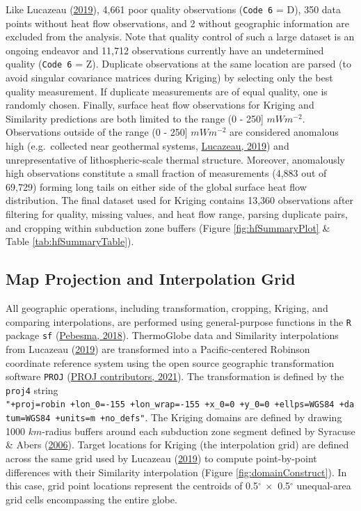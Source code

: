 Like Lucazeau (\protect\hyperlink{ref-lucazeau2019}{2019}), 4,661 poor quality observations (\texttt{Code\ 6} = D), 350 data points without heat flow observations, and 2 without geographic information are excluded from the analysis. Note that quality control of such a large dataset is an ongoing endeavor and 11,712 observations currently have an undetermined quality (\texttt{Code\ 6} = Z). Duplicate observations at the same location are parsed (to avoid singular covariance matrices during Kriging) by selecting only the best quality measurement. If duplicate measurements are of equal quality, one is randomly chosen. Finally, surface heat flow observations for Kriging and Similarity predictions are both limited to the range (0 - 250{]} \(mWm^{-2}\). Observations outside of the range (0 - 250{]} \(mWm^{-2}\) are considered anomalous high (e.g.~collected near geothermal systems, \protect\hyperlink{ref-lucazeau2019}{Lucazeau, 2019}) and unrepresentative of lithospheric-scale thermal structure. Moreover, anomalously high observations constitute a small fraction of measurements (4,883 out of 69,729) forming long tails on either side of the global surface heat flow distribution. The final dataset used for Kriging contains 13,360 observations after filtering for quality, missing values, and heat flow range, parsing duplicate pairs, and cropping within subduction zone buffers (Figure \ref{fig:hfSummaryPlot} \& Table \ref{tab:hfSummaryTable}).

\hypertarget{map-projection-and-interpolation-grid}{%
\subsection{Map Projection and Interpolation Grid}\label{map-projection-and-interpolation-grid}}

All geographic operations, including transformation, cropping, Kriging, and comparing interpolations, are performed using general-purpose functions in the \texttt{R} package \texttt{sf} (\protect\hyperlink{ref-pebesma2018}{Pebesma, 2018}). ThermoGlobe data and Similarity interpolations from Lucazeau (\protect\hyperlink{ref-lucazeau2019}{2019}) are transformed into a Pacific-centered Robinson coordinate reference system using the open source geographic transformation software \texttt{PROJ} (\protect\hyperlink{ref-proj2021}{PROJ contributors, 2021}). The transformation is defined by the \texttt{proj4} string \texttt{"+proj=robin\ +lon\_0=-155\ +lon\_wrap=-155\ +x\_0=0\ +y\_0=0\ +ellps=WGS84\ +datum=WGS84\ +units=m\ +no\_defs"}. The Kriging domains are defined by drawing 1000 \(km\)-radius buffers around each subduction zone segment defined by Syracuse \& Abers (\protect\hyperlink{ref-syracuse2006}{2006}). Target locations for Kriging (the interpolation grid) are defined across the same grid used by Lucazeau (\protect\hyperlink{ref-lucazeau2019}{2019}) to compute point-by-point differences with their Similarity interpolation (Figure \ref{fig:domainConstruct}). In this case, grid point locations represent the centroids of 0.5\(^\circ\ \times\) 0.5\(^\circ\) unequal-area grid cells encompassing the entire globe.



